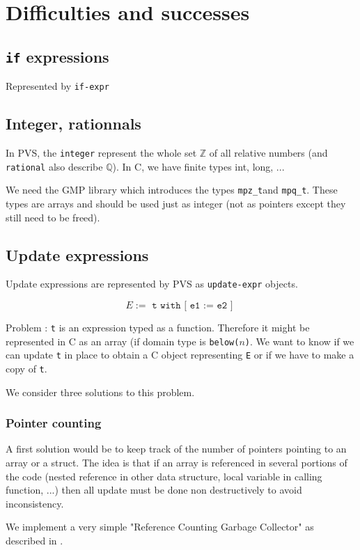\documentclass[12pt,a4paper,titlepage]{article}
\newcommand{\cl}[1]{\texttt{#1}}
\newcommand{\Z}{\mathbb{Z}}
\newcommand{\Q}{\mathbb{Q}}
\newcommand{\mpzt}{\texttt{mpz\_t}}
\newcommand{\mpqt}{\texttt{mpq\_t}}
\begin{document}
\section{Difficulties and successes}


\subsection{\texttt{if} expressions}
Represented by \texttt{if-expr}

\subsection{Integer, rationnals}
In PVS, the \texttt{integer} represent the whole set $\Z$ of all relative numbers (and \texttt{rational} also describe $\Q$).
In C, we have finite types
int, long, ...

We need the GMP library which introduces the types \mpzt and \mpqt.
These types are arrays and should be used just as integer (not as pointers except they still need to be freed).

\subsection{Update expressions}
Update expressions are represented by PVS as \texttt{update-expr} objects.

$$ E := \texttt{ t with [ e1 := e2 ] } $$


Problem :
\cl{t} is an expression typed as a function. Therefore it might be represented in C as an array (if domain type is \cl{below($n$)}.
We want to know if we can update \cl{t} in place to obtain a C object representing \cl{E} or if we have to make a copy of \cl{t}.


We consider three solutions to this problem.

\subsubsection{Pointer counting}

A first solution would be to keep track of the number of pointers pointing to an array or a struct. The idea is that if an array is referenced in several portions of the code (nested reference in other data structure, local variable in calling function, ...) then all update must be done non destructively to avoid inconsistency.




We implement a very simple "Reference Counting Garbage Collector" as described in \cite{jonesgarbage}.\\
\end{document}
